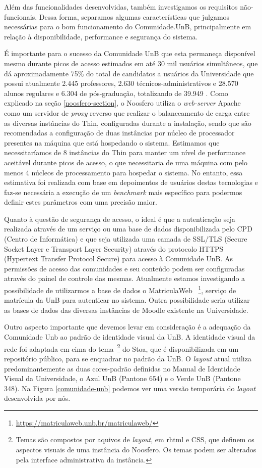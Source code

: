 Além das funcionalidades desenvolvidas, também investigamos os requisitos
não-funcionais. Dessa forma, separamos algumas características que
julgamos necessárias para o bom funcionamento do Comunidade.UnB, principalmente
em relação à disponibilidade, performance e segurança do sistema.

É importante para o sucesso da Comunidade UnB que esta permaneça disponível
mesmo durante picos de acesso estimados em até 30 mil usuários simultâneos,
que dá aproximadamente 75\% do total de candidatos a usuários da Universidade
que possui atualmente 2.445 professores, 2.630 técnicos-administrativos
e 28.570 alunos regulares e 6.304 de pós-graduação, totalizando de 39.949
\cite{unbInstituicao}. Como explicado na seção \ref{noosfero-section}, o Noosfero
utiliza o \textit{web-server} Apache como um servidor de \textit{proxy} reverso
que realizar o balanceamento de carga entre as diversas instâncias do Thin,
configuradas durante a instalação, sendo que são recomendadas a configuração de
duas instâncias por núcleo de processador presentes na máquina que está
hospedando o sistema.
%
Estimamos que necessitaríamos de 8 instâncias do Thin
para manter um nível de performance aceitável durante picos de acesso, o que
necessitaria de uma máquina com pelo menos 4 núcleos de processamento para
hospedar o sistema. No entanto, essa estimativa foi realizada com base em
depoimentos de usuários destas tecnologias e faz-se necessária a execução de
um \textit{benchmark} mais específico para podermos definir estes parâmetros com
uma precisão maior.

Quanto à questão de segurança de acesso, o ideal é que a autenticação seja
realizada através de um serviço ou uma base de dados disponibilizada pelo CPD
(Centro de Informática) e que seja utilizada uma camada de SSL/TLS (Secure Socket
Layer e Transport Layer Security) através do protocolo HTTPS (Hypertext Transfer
Protocol Secure) para acesso à Comunidade UnB. As permissões de acesso das
comunidades e seu conteúdo podem ser configuradas através do painel de controle
das mesmas. Atualmente estamos investigando a possibilidade de utilizarmos a
base de dados o MatriculaWeb
~\footnote{\url{https://matriculaweb.unb.br/matriculaweb/}}, serviço de matrícula
da UnB para autenticar no sistema. Outra possibilidade seria utilizar as bases
de dados das diversas instâncias de Moodle existente na Universidade.


Outro aspecto importante que devemos levar em consideração é a adequação da
Comunidade Unb ao padrão de identidade visual da UnB.
A identidade visual da rede foi adaptada em cima do tema~\footnote{Temas são
compostos por aquivos de \textit{layout}, em rhtml e CSS, que definem os aspectos
visuais de uma instância do Noosfero. Os temas podem ser alterados pela interface
administrativa da instância.} do Stoa, que é disponibilizada em um repositório
público, para se enquadrar no padrão da UnB.
%
O \textit{layout} atual utiliza predominantemente as duas cores-padrão definidas
no Manual de Identidade Visual da Universidade\cite{visualUnB}, o Azul UnB
(Pantone 654) e o Verde UnB (Pantone 348). Na Figura \ref{comunidade-unb}
podemos ver uma versão temporária do \textit{layout} desenvolvida por nós.



